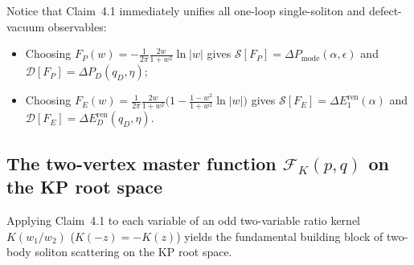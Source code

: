 \documentclass[11pt,a4paper]{article}
\begin{document}
Notice that Claim~4.1 immediately unifies all one-loop single-soliton and
defect-vacuum observables:
\begin{itemize}
\item Choosing $F_P(w) = -\frac{1}{2\pi}\frac{2w}{1+w^2}\ln|w|$ gives
$\mathcal{S}[F_P] = \Delta P_{\mathrm{mode}}(\alpha,\epsilon)$ and
$\mathcal{D}[F_P] = \Delta P_D(q_D,\eta)$;
\item Choosing $F_E(w) = \frac{1}{2\pi}\frac{2w}{1+w^2}\big(1 - \frac{1-w^2}{1+w^2}\ln|w|\big)$
gives $\mathcal{S}[F_E] = \Delta E_1^{\mathrm{ren}}(\alpha)$ and
$\mathcal{D}[F_E] = \Delta E_D^{\mathrm{ren}}(q_D,\eta)$.
\end{itemize}

\subsection{The two-vertex master function $\mathcal{F}_K(p,q)$ on the KP root space}

Applying Claim~4.1 to each variable of an odd two-variable ratio kernel
$K(w_1/w_2)$ ($K(-z) = -K(z)$) yields the fundamental building block of two-body
soliton scattering on the KP root space.
\end{document}

